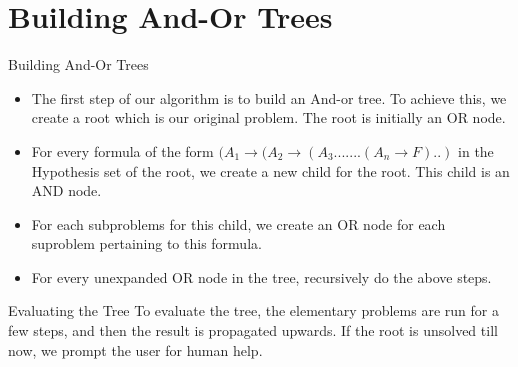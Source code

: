 \documentclass{beamer}
\begin{document}
  


\section{Building And-Or Trees}

\begin{frame}{Building And-Or Trees}

\begin{itemize}
\item
 The first step of our algorithm is to build an And-or tree. To achieve this, we create a root which is our original problem. The root is initially an OR node. 
\item 
 For every formula of the form $(A_{1}\rightarrow(A_{2}\rightarrow(A_{3}.......(A_{n}\rightarrow F)..)$ in the Hypothesis set of the root, we create a new child for the root. This child is an AND node. 
\item 
 For each subproblems for this child, we create an OR node for each suproblem pertaining to this formula.
\item
 For every unexpanded OR node in the tree, recursively do the above steps.
 
\end{itemize}	

\end{frame}



\begin{frame}{Evaluating the Tree}
  To evaluate the tree, the elementary problems are run for a few steps, and then the result is propagated upwards. If the root is unsolved till now, we prompt the user for human help. 

\end{frame}
\end{document}
